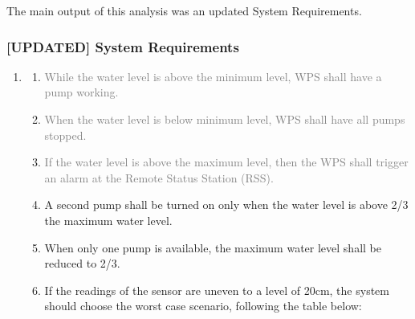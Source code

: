 \documentclass[11pt]{article}
\begin{document}
The main output of this analysis was an updated System Requirements.


\subsubsection{[UPDATED] System Requirements}

\begin{enumerate}[leftmargin=4em, font=\small, label=\textbf{SR-\arabic*}]
	\setlength\itemsep{.5em}
	\item 

		\begin{enumerate}[leftmargin=1.5em, font=\small, label=\textbf{.\arabic*:}]
		\setlength\itemsep{0em}
		\item \textcolor{gray}{While the water level is above the minimum level, WPS shall have a pump working.}
		\item \textcolor{gray}{When the water level is below minimum level, WPS shall have all pumps stopped.}
		\item \textcolor{gray}{If the water level is above the maximum level, then the WPS shall trigger an alarm at the Remote Status Station (RSS).}
		
		\item A second pump shall be turned on only when the water level is above 2/3 the maximum water level.
		\item When only one pump is available, the maximum water level shall be reduced to 2/3.
		\item If the readings of the sensor are uneven to a level of 20cm, the system should choose the worst case scenario, following the table below: 
		

\end{enumerate}
\end{enumerate}
\end{document}
